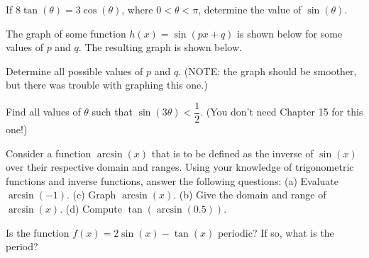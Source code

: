 \documentclass[lang=en,11pt]{elegantbook}
\begin{document}
\begin{challengeset}
\item If $8\tan(\theta)=3\cos(\theta)$, where $0<\theta<\pi$, determine the value of $\sin(\theta)$. \vspace{3mm}
\item The graph of some function $h(x)=\sin(px+q)$ is shown below for some values of $p$ and $q$. The resulting graph is shown below.

\begin{figure}[!h]
    \centering
\end{figure}

Determine all possible values of $p$ and $q$. (NOTE: the graph should be smoother, but there was trouble with graphing this one.) \vspace{3mm}
\item Find all values of $\theta$ such that $\sin(3\theta)<\dfrac{1}{2}$. (You don't need Chapter 15 for this one!) \vspace{3mm}
\item Consider a function $\arcsin(x)$ that is to be defined as the inverse of $\sin(x)$ over their respective domain and ranges.  Using your knowledge of trigonometric functions and inverse functions, answer the following questions: \newline 
(a) Evaluate $\arcsin(-1)$.  (c) Graph $\arcsin(x)$.  \newline 
(b) Give the domain and range of $\arcsin(x)$.  (d) Compute $\tan(\arcsin(0.5))$. \vspace{3mm}
\item Is the function $f(x)=2\sin(x)-\tan(x)$ periodic? If so, what is the period? \vspace{3mm}
\end{challengeset}
\end{document}
